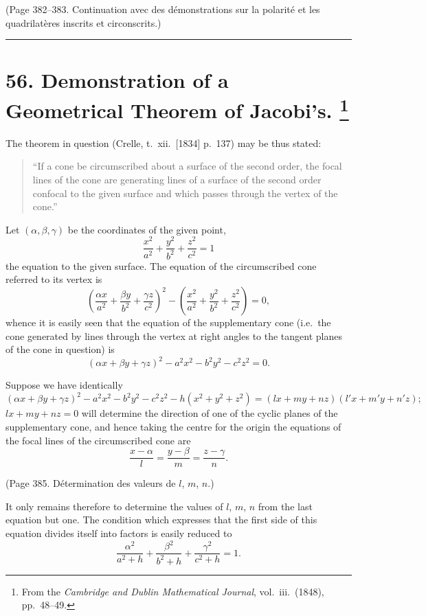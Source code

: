 \documentclass[11pt,a4paper]{book}
\begin{document}
(Page 382--383. Continuation avec des d\'{e}monstrations sur la polarit\'{e} et
les quadrilat\`{e}res inscrits et circonscrits.)

\bigskip
\hrule
\bigskip


\newpage
\section[Demonstration of a Geometrical Theorem of Jacobi's]{%
56. Demonstration of a Geometrical Theorem of Jacobi's.%
\footnote{From the \textit{Cambridge and Dublin Mathematical Journal}, vol.~iii.\ (1848), pp.~48--49.}}

The theorem in question (Crelle, t.~xii.\ [1834] p.~137) may be thus stated:
\begin{quote}
``If a cone be circumscribed about a surface of the second order, the focal lines
of the cone are generating lines of a surface of the second order confocal to the given
surface and which passes through the vertex of the cone.''
\end{quote}

Let $(\alpha, \beta, \gamma)$ be the coordinates of the given point,
\[
\frac{x^2}{a^2} + \frac{y^2}{b^2} + \frac{z^2}{c^2} = 1
\]
the equation to the given surface. The equation of the circumscribed cone referred to
its vertex is
\[
\left(\frac{\alpha x}{a^2} + \frac{\beta y}{b^2} + \frac{\gamma z}{c^2}\right)^2
- \left(\frac{x^2}{a^2} + \frac{y^2}{b^2} + \frac{z^2}{c^2}\right) = 0,
\]
whence it is easily seen that the equation of the supplementary cone (i.e.\ the cone
generated by lines through the vertex at right angles to the tangent planes of the
cone in question) is
\[
(\alpha x + \beta y + \gamma z)^2 - a^2x^2 - b^2y^2 - c^2z^2 = 0. \tag{$*$}
\]

Suppose we have identically
\[
(\alpha x + \beta y + \gamma z)^2 - a^2x^2 - b^2y^2 - c^2z^2 - h(x^2 + y^2 + z^2)
= (lx + my + nz)(l'x + m'y + n'z);
\]
$lx + my + nz = 0$ will determine the direction of one of the cyclic planes of the
supplementary cone, and hence taking the centre for the origin the equations of the focal
lines of the circumscribed cone are
\[
\frac{x - \alpha}{l} = \frac{y - \beta}{m} = \frac{z - \gamma}{n}.
\]

(Page 385. D\'{e}termination des valeurs de $l$, $m$, $n$.)

It only remains therefore to determine the values of $l$, $m$, $n$ from the last equation
but one. The condition which expresses that the first side of this equation divides
itself into factors is easily reduced to
\[
\frac{\alpha^2}{a^2 + h} + \frac{\beta^2}{b^2 + h} + \frac{\gamma^2}{c^2 + h} = 1. \tag{A}
\]
\end{document}

